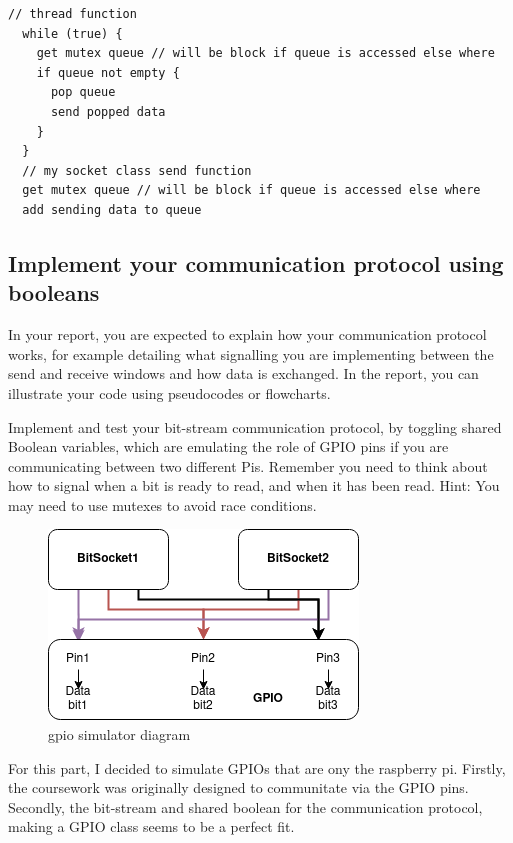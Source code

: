 \documentclass[11pt]{article}
\begin{document}
\begin{multicols*}{2}
\begin{lstlisting}[caption={}]
  // thread function
  while (true) {
    get mutex queue // will be block if queue is accessed else where
    if queue not empty {
      pop queue
      send popped data
    }
  }
  // my socket class send function
  get mutex queue // will be block if queue is accessed else where
  add sending data to queue
\end{lstlisting}

   
\subsection{Implement your communication protocol using booleans}
\label{sec:comm-protocols}
In your report, you are expected to explain how your communication protocol works, for example detailing what signalling you are implementing between the send and receive windows and how data is exchanged. In the report, you can illustrate your code using pseudocodes or flowcharts. 

Implement and test your bit-stream communication protocol, by toggling shared Boolean variables, which are emulating the role of GPIO pins if you are communicating between two different Pis. Remember you need to think about how to signal when a bit is ready to read, and when it has been read.  Hint: You may need to use mutexes to avoid race conditions.

\begin{figure}[H]
  \centering
  \includegraphics[width=0.7\columnwidth]{gpio-design}
  \caption{gpio simulator diagram}
  \label{fig:gpio-design}
\end{figure}
\figsquish

For this part, I decided to simulate GPIOs that are ony the raspberry pi. Firstly, the coursework was originally designed to communitate via the GPIO pins. Secondly, the bit-stream and shared boolean for the communication protocol, making a GPIO class seems to be a perfect fit.


\end{multicols*}
\end{document}
